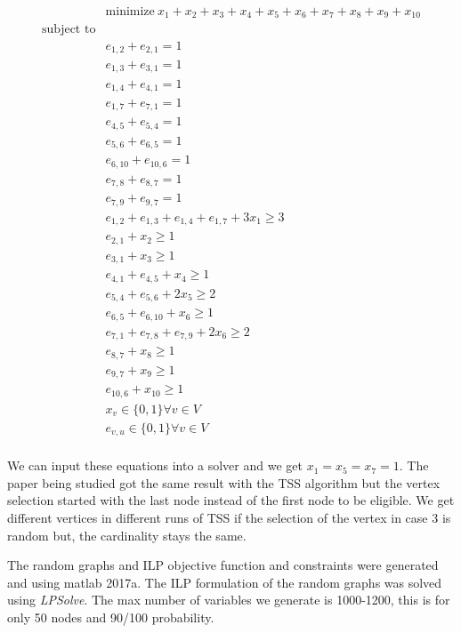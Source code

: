 \begin{equation*}
	\begin{aligned}
	&&& {\text{minimize}} \ x_{1}+x_{2}+x_{3}+x_{4}+x_{5}+x_{6}+x_{7}+x_{8}+x_{9}+x_{10}&&\\ 
	&&\text{subject to} &&& \\
	&&&e_{1,2}+e_{2,1}=1&&\\
	&&&e_{1,3}+e_{3,1}=1&&\\
	&&&e_{1,4}+e_{4,1}=1&&\\
	&&&e_{1,7}+e_{7,1}=1&&\\
	&&&e_{4,5}+e_{5,4}=1&&\\
	&&&e_{5,6}+e_{6,5}=1&&\\
	&&&e_{6,10}+e_{10,6}=1&&\\
	&&&e_{7,8}+e_{8,7}=1&&\\
	&&&e_{7,9}+e_{9,7}=1&&\\	
	&&& e_{1,2}+e_{1,3}+e_{1,4}+e_{1,7}+3x_{1}\geq 3&&\\
	&&& e_{2,1} + x_{2}\geq 1&&\\
	&&& e_{3,1} + x_{3}\geq 1&&\\
	&&& e_{4,1} + e_{4,5} + x_{4}\geq 1&&\\
	&&& e_{5,4} + e_{5,6} + 2 x_{5}\geq 2&&\\
	&&& e_{6,5} + e_{6,10} + x_{6}\geq 1&&\\
	&&& e_{7,1} + e_{7,8} + e_{7,9} + 2 x_{6}\geq 2&&\\
	&&& e_{8,7} + x_{8}\geq 1&&\\
	&&& e_{9,7} + x_{9}\geq 1&&\\
	&&& e_{10,6} + x_{10}\geq 1&&\\
	&&&x_{v} \in \{0,1\}  \forall v \in V&&\\
	&&&e_{v,u}\in \{0,1\}  \forall v \in V &&\\
	\end{aligned}
\end{equation*}

We can input these equations into a solver and we get $x_{1}=x_{5}=x_{7}=1$. The paper being studied got the same result with the TSS algorithm but the vertex selection started with the last node instead of the first node to be eligible. We get different vertices in different runs of TSS if the selection of the vertex in case 3 is random but, the cardinality stays the same.

The random graphs and ILP objective function and constraints were generated and using matlab 2017a. The ILP formulation of the random graphs was solved using \textit{LPSolve}\cite{lpsolve}. The max number of variables we generate is 1000-1200, this is for only 50 nodes and 90/100 probability.

